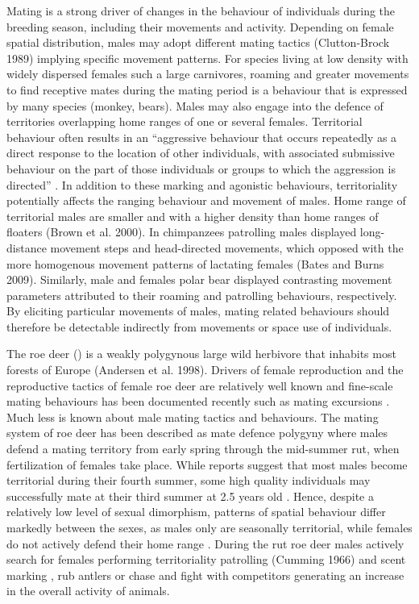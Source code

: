 \documentclass[a4paper,11pt]{article}
\newcommand{\nico}[1]{\todo[backgroundcolor=red!25,bordercolor=red]{\small #1}}
\newcommand{\species}[1]{(\xmakefirstuc{\emph{#1}})}
\begin{document}
Mating is a strong driver of changes in the behaviour of individuals
during the breeding season, including their movements and
activity. Depending on female spatial distribution, males may adopt
different mating tactics (Clutton-Brock 1989) implying specific
movement patterns. For species living at low density with widely
dispersed females such a large carnivores, roaming and greater
movements to find receptive mates during the mating period is a
behaviour that is expressed by many species (monkey, bears\nico{refs}). Males may
also engage into the defence of territories overlapping home ranges of
one or several females. Territorial behaviour often results in an
“aggressive behaviour that occurs repeatedly as a direct response to
the location of other individuals, with associated submissive
behaviour on the part of those individuals or groups to which the
aggression is directed” \citep{pyke_territoriality_1996}. In addition
to these marking and agonistic behaviours, territoriality potentially
affects the ranging behaviour and movement of males. Home range of
territorial males are smaller and with a higher density than home
ranges of floaters (Brown et al. 2000). In chimpanzees patrolling
males displayed long-distance movement steps and head-directed
movements, which opposed with the more homogenous movement patterns of
lactating females (Bates and Burns 2009). Similarly, male and females
polar bear displayed contrasting movement parameters attributed to
their roaming and patrolling behaviours, respectively\nico{ref}. By eliciting
particular movements of males, mating related behaviours should
therefore be detectable indirectly from movements or space use of
individuals.

The roe deer \species{Capreolus capreolus} is a weakly polygynous
large wild herbivore that inhabits most forests of Europe (Andersen et
al. 1998). Drivers of female reproduction and the reproductive tactics
of female roe deer are relatively well known
\citep{andersen_social_1998} and fine-scale mating behaviours has been
documented recently such as mating excursions
\citep{debeffe_one_2014}. Much less is known about male mating tactics
and behaviours. The mating system of roe deer has been described as
mate defence polygyny \citep{vanpe_mating_2008} where males defend a
mating territory from early spring through the mid-summer rut, when
fertilization of females take place. While reports suggest that most
males become territorial during their fourth summer, some high quality
individuals may successfully mate at their third summer at 2.5 years old
\citep{vanpe_age-specific_2009}. Hence, despite a relatively low level
of sexual dimorphism, patterns of spatial behaviour differ markedly
between the sexes, as males only are seasonally territorial, while
females do not actively defend their home range \citep[but
see][]{maublanc_ranging_2012}. During the rut roe deer males
actively search for females performing territoriality patrolling (Cumming
1966) and scent marking \citep{gosling_reassessment_1982}, rub antlers or chase and fight with competitors generating an increase in the overall activity of animals.
\end{document}
